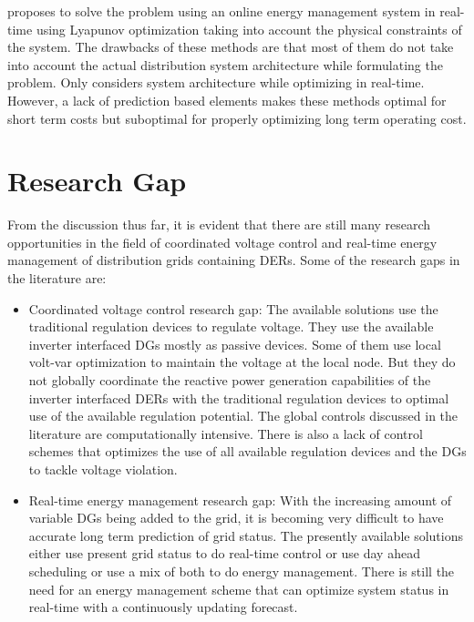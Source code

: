 \cite{Wen17} proposes to solve the problem using an online energy management system in real-time using Lyapunov optimization taking into account the physical constraints of the system.
The drawbacks of these methods are that most of them do not take into account the actual distribution system architecture while formulating the problem. Only \cite{Wen17} considers system architecture while optimizing in real-time. However, a lack of prediction based elements makes these methods optimal for short term costs but suboptimal for properly optimizing long term operating cost.


\section{Research Gap}
From the discussion thus far, it is evident that there are still many research opportunities in the field of coordinated voltage control and real-time energy management of distribution grids containing DERs. Some of the research gaps in the literature are:

\begin{itemize}
    \item Coordinated voltage control research gap: The available solutions use the traditional regulation devices to regulate voltage. They use the available inverter interfaced DGs mostly as passive devices. Some of them use local volt-var optimization to maintain the voltage at the local node. But they do not globally coordinate the reactive power generation capabilities of the inverter interfaced DERs with the traditional regulation devices to optimal use of the available regulation potential. The global controls discussed in the literature are computationally intensive. There is also a lack of control schemes that optimizes the use of all available regulation devices and the DGs to tackle voltage violation.
    
    \item Real-time energy management research gap: With the increasing amount of variable DGs being added to the grid, it is becoming very difficult to have accurate long term prediction of grid status. The presently available solutions either use present grid status to do real-time control or use day ahead scheduling or use a mix of both to do energy management. There is still the need for an energy management scheme that can optimize system status in real-time with a continuously updating forecast. 
\end{itemize}

